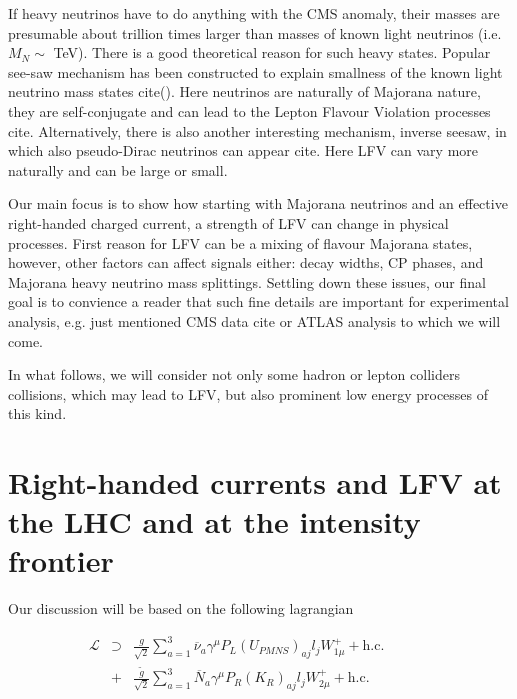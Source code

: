 \documentclass[twocolumn,superscriptaddress,showpacs,prl,nofootinbib,floatfix]{revtex4}
\begin{document}
If heavy neutrinos have to do anything with the CMS anomaly, their masses are presumable about trillion times larger than masses of known light neutrinos (i.e. $M_{N}\sim $ TeV). 
There is a good theoretical reason for such heavy states. Popular see-saw mechanism has been constructed  to explain smallness of the known light neutrino mass states cite(). Here neutrinos are naturally of Majorana nature, they are self-conjugate and can lead to the Lepton Flavour Violation processes cite. Alternatively, there is also another  interesting mechanism,  inverse seesaw, in which also pseudo-Dirac
neutrinos can appear cite. Here LFV can vary more naturally and can be large or small.

  Our main focus is to show how starting with Majorana neutrinos and an
  effective right-handed charged current, a strength of LFV can change in physical processes. 
  First reason for LFV can be a mixing of flavour Majorana states, however, other factors can affect signals either: decay widths, CP phases, and Majorana heavy neutrino mass splittings. Settling down these issues, our final goal is to convience a reader that such fine details are important for experimental analysis, e.g. just mentioned CMS data cite or 
  ATLAS analysis to which we will come. 
  
  In what follows,  we will consider not only some hadron or lepton colliders collisions, which may lead to LFV, but also prominent low energy processes of this kind. 
  
\section{Right-handed currents and LFV at the LHC and at the intensity frontier}

Our discussion will be based on the following lagrangian

\begin{eqnarray}
\mathcal{L}&\supset& \frac{{g}}{\sqrt{2}}\sum\limits_{a=1}^3\overline{\nu}_a\gamma^{\mu}P_L(U_{PMNS})_{aj}l_jW_{1\mu}^{+}
+\mathrm{h.c.}  \;\;\;\;\;\;\;\;\;\;\;\;\label{lagr1} \\
&+&\frac{\tilde{g}}{\sqrt{2}}\sum\limits_{a=1}^3\overline{N}_a\gamma^{\mu}P_R(K_{R})_{aj}l_jW_{2\mu}^{+} +\mathrm{h.c.} \;\;\;\;\label{lagr2}
%
%
\end{eqnarray}
\end{document}
